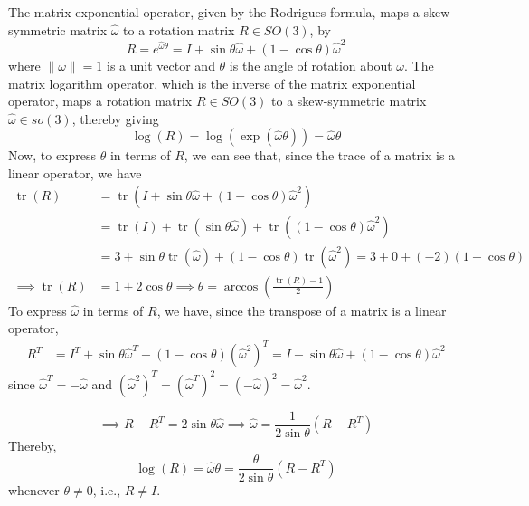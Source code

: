 The matrix exponential operator, given by the Rodrigues formula, maps a skew-symmetric matrix \( \hat \omega \) to a rotation matrix \( R \in SO(3) \), by
\begin{equation*}
    R
    = e^{\hat \omega \theta}
    = I + \sin \theta \hat \omega + (1 - \cos \theta) \hat \omega^2
\end{equation*}
where \( \lVert \omega \rVert = 1 \) is a unit vector and \( \theta \) is the angle of rotation about \( \omega \).
The matrix logarithm operator, which is the inverse of the matrix exponential operator, maps a rotation matrix \( R \in SO(3) \) to a skew-symmetric matrix \( \hat \omega \in so(3) \), thereby giving
\begin{equation*}
    \log \left( R \right)
    =
    \log \left( \exp (\hat \omega \theta) \right)
    =
    \hat \omega \theta
\end{equation*}
Now, to express \( \theta \) in terms of \( R \), we can see that, since the trace of a matrix is a linear operator, we have
\begin{align*}
    \operatorname{tr} \left( R \right)
     & =
    \operatorname{tr} \left( I + \sin \theta \hat \omega + (1 - \cos \theta) \hat \omega^2 \right)
    \\ & =
    \operatorname{tr} \left( I \right)
    + \operatorname{tr} \left( \sin \theta \hat \omega \right)
    + \operatorname{tr} \left( (1 - \cos \theta) \hat \omega^2 \right)
    \\ & =
    3
    + \sin \theta \operatorname{tr} \left( \hat \omega \right)
    + (1 - \cos \theta) \operatorname{tr} \left( \hat \omega^2 \right)
    =
    3 + 0 + (-2) (1 - \cos \theta)
    \\
    \implies
    \operatorname{tr} \left( R \right)
     & =
    1 + 2 \cos \theta
    \implies
    \theta
    =
    \arccos \left( \frac{\operatorname{tr} \left( R \right) - 1}{2} \right)
\end{align*}
To express \( \hat \omega \) in terms of \( R \), we have, since the transpose of a matrix is a linear operator,
\begin{align*}
    R^T
     & =
    I^T + \sin \theta \hat \omega^T + (1 - \cos \theta) {(\hat \omega^2)}^T
    =
    I - \sin \theta \hat \omega + (1 - \cos \theta) \hat \omega^2
\end{align*}
since \( \hat \omega^T = -\hat \omega \) and \( {(\hat \omega^2)}^T = {({\hat \omega}^T)}^2 = {(-\hat \omega)}^2 = \hat \omega^2 \).

\begin{equation*}
    \implies
    R - R^T
    =
    2 \sin \theta \hat \omega
    \implies
    \hat \omega
    =
    \frac{1}{2 \sin \theta} (R - R^T)
\end{equation*}
Thereby,
\begin{equation*}
    \log \left( R \right)
    =
    \hat \omega \theta
    =
    \frac{\theta}{2 \sin \theta} (R - R^T)
\end{equation*}
whenever \( \theta \neq 0 \), i.e., \( R \neq I \).
